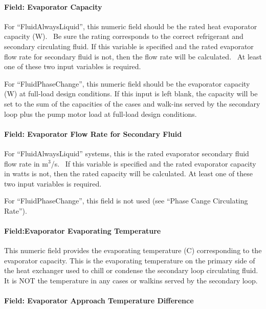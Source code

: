 \paragraph{Field: Evaporator Capacity}\label{field-evaporator-capacity}

For ``FluidAlwaysLiquid'', this numeric field should be the rated heat evaporator capacity (W).~ Be sure the rating corresponds to the correct refrigerant and secondary circulating fluid. If this variable is specified and the rated evaporator flow rate for secondary fluid is not, then the flow rate will be calculated.~ At least one of these two input variables is required.

For ``FluidPhaseChange'', this numeric field should be the evaporator capacity (W) at full-load design conditions. If this input is left blank, the capacity will be set to the sum of the capacities of the cases and walk-ins served by the secondary loop plus the pump motor load at full-load design conditions.

\paragraph{Field: Evaporator Flow Rate for Secondary Fluid}\label{field-evaporator-flow-rate-for-secondary-fluid}

For ``FluidAlwaysLiquid'' systems, this is the rated evaporator secondary fluid flow rate in m\(^{3}\)/s.~ If this variable is specified and the rated evaporator capacity in watts is not, then the rated capacity will be calculated. At least one of these two input variables is required.

For ``FluidPhaseChange'', this field is not used (see ``Phase Cange Circulating Rate'').

\paragraph{Field:Evaporator Evaporating Temperature}\label{fieldevaporator-evaporating-temperature}

This numeric field provides the evaporating temperature (C) corresponding to the evaporator capacity. This is the evaporating temperature on the primary side of the heat exchanger used to chill or condense the secondary loop circulating fluid.~ It is NOT the temperature in any cases or walkins served by the secondary loop.

\paragraph{Field: Evaporator Approach Temperature Difference}\label{field-evaporator-approach-temperature-difference}

